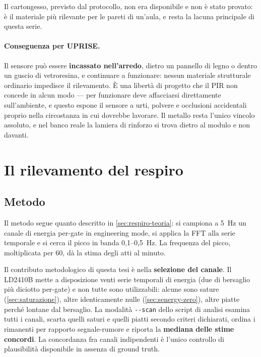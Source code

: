 Il cartongesso, previsto dal protocollo, non era disponibile e non è stato provato:
è il materiale più rilevante per le pareti di un'aula, e resta la lacuna principale
di questa serie.

\paragraph{Conseguenza per UPRISE.} Il sensore può essere \textbf{incassato
nell'arredo}, dietro un pannello di legno o dentro un guscio di vetroresina, e
continuare a funzionare: nessun materiale strutturale ordinario impedisce il
rilevamento. È una libertà di progetto che il PIR non concede in alcun modo --- per
funzionare deve affacciarsi direttamente sull'ambiente, e questo espone il sensore a
urti, polvere e occlusioni accidentali proprio nella circostanza in cui dovrebbe
lavorare. Il metallo resta l'unico vincolo assoluto, e nel banco reale la lamiera di
rinforzo si trova dietro al modulo e non davanti.

\section{Il rilevamento del respiro}
\label{sec:respiro}

\subsection{Metodo}

Il metodo segue quanto descritto in \cref{sec:respiro-teoria}: si campiona a 5~Hz
un canale di energia per-gate in engineering mode, si applica la FFT alla serie
temporale e si cerca il picco in banda 0,1--0,5~Hz. La frequenza del picco,
moltiplicata per 60, dà la stima degli atti al minuto.

Il contributo metodologico di questa tesi è nella \textbf{selezione del canale}. Il
LD2410B mette a disposizione venti serie temporali di energia (due di bersaglio più
diciotto per-gate) e non tutte sono utilizzabili: alcune sono sature
(\cref{sec:saturazione}), altre identicamente nulle (\cref{sec:senergy-zero}), altre
piatte perché lontane dal bersaglio. La modalità \texttt{-{}-scan} dello script di
analisi esamina tutti i canali, scarta quelli saturi e quelli piatti secondo criteri
dichiarati, ordina i rimanenti per rapporto segnale-rumore e riporta la
\textbf{mediana delle stime concordi}. La concordanza fra canali indipendenti è
l'unico controllo di plausibilità disponibile in assenza di ground truth.

